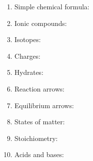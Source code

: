 \documentclass[border=5mm]{standalone}
\begin{document}
\begin{minipage}{\textwidth}
\begin{enumerate}
\item Simple chemical formula: 
\item Ionic compounds: 
\item Isotopes: 
\item Charges: 
\item Hydrates: 
\item Reaction arrows: 
\item Equilibrium arrows: 
\item States of matter: 
\item Stoichiometry: 
\item Acids and bases: 
\end {enumerate}
\end {minipage}
\end{document}
